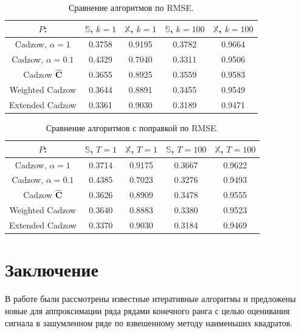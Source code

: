 \documentclass[12pt,a4paper,fleqn,leqno]{article}
\newcommand{\tsS}{\mathbb{S}}
\newcommand{\tsX}{\mathbb{X}}
\newcommand{\bfC}{\mathbf{C}}
\begin{document}
\begin{table}[!hhh]
\begin{center}
\caption{Сравнение алгоритмов по RMSE.}\label{fintable}
\begin{tabular}{|c|c|c|c|c|}
\hline
$P$: & $\tsS$, $k = 1$ & $\tsX$, $k = 1$ & $\tsS$, $k = 100$ & $\tsX$, $k = 100$  \\
\hline
Cadzow, $\alpha = 1$ & 0.3758 & 0.9195 & 0.3782 & 0.9664 \\
\hline
Cadzow, $\alpha = 0.1$ & 0.4329 & 0.7040 & 0.3311 & 0.9506 \\
\hline
Cadzow $\hat{\bfC}$ & 0.3655 & 0.8925 & 0.3559 & 0.9583 \\
\hline
Weighted Cadzow & 0.3644 & 0.8891 & 0.3455 & 0.9549 \\
\hline
Extended Cadzow & 0.3361 & 0.9030 & 0.3189 & 0.9471 \\
\hline
\end{tabular}
\end{center}
\end{table}

\begin{table}[!hhh]
	\begin{center}
		\caption{Сравнение алгоритмов с поправкой по RMSE.}\label{fintable_improved}
		\begin{tabular}{|c|c|c|c|c|}
			\hline
			$P$: & $\tsS$, $T = 1$ & $\tsX$, $T = 1$ & $\tsS$, $T = 100$ & $\tsX$, $T = 100$  \\
			\hline
			Cadzow, $\alpha = 1$ & 0.3714 & 0.9175 & 0.3667 & 0.9622 \\
			\hline
			Cadzow, $\alpha = 0.1$ & 0.4385 & 0.7023 & 0.3276 & 0.9493 \\
			\hline
			Cadzow $\hat{\bfC}$ & 0.3626 & 0.8909 & 0.3478 & 0.9555 \\
			\hline
			Weighted Cadzow & 0.3640 & 0.8883 & 0.3380 & 0.9523 \\
			\hline
			Extended Cadzow & 0.3370 & 0.9030 & 0.3184 & 0.9469 \\
			\hline
		\end{tabular}
	\end{center}
\end{table}

\section{Заключение}
\label{sec:concl}
В работе были рассмотрены известные итеративные алгоритмы и предложены новые для аппроксимации ряда рядами конечного ранга с целью
оценивания сигнала в зашумленном ряде по взвешенному методу наименьших квадратов.
\end{document}
